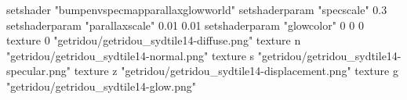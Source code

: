setshader "bumpenvspecmapparallaxglowworld"
setshaderparam "specscale" 0.3
setshaderparam "parallaxscale" 0.01 0.01
setshaderparam "glowcolor" 0 0 0
texture 0 "getridou/getridou_sydtile14-diffuse.png"
texture n "getridou/getridou_sydtile14-normal.png"
texture s "getridou/getridou_sydtile14-specular.png"
texture z "getridou/getridou_sydtile14-displacement.png"
texture g "getridou/getridou_sydtile14-glow.png"
